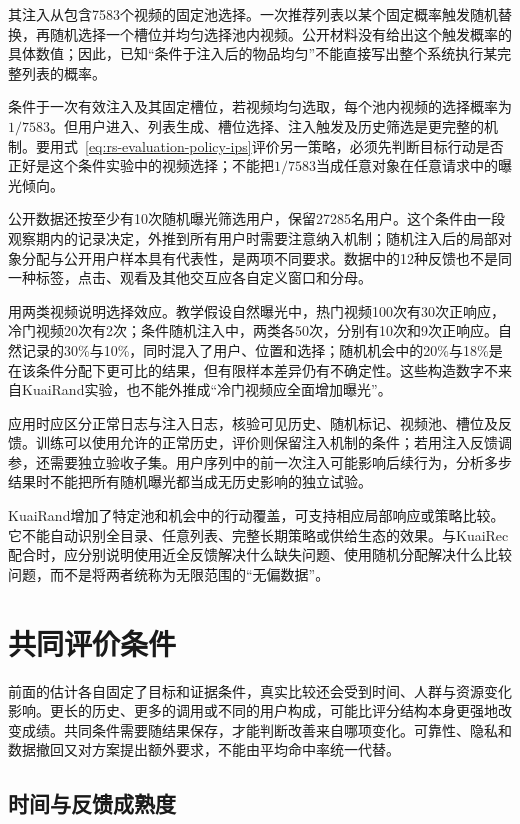 其注入从包含7583个视频的固定池选择。一次推荐列表以某个固定概率触发随机替换，再随机选择一个槽位并均匀选择池内视频。公开材料没有给出这个触发概率的具体数值；因此，已知“条件于注入后的物品均匀”不能直接写出整个系统执行某完整列表的概率。

条件于一次有效注入及其固定槽位，若视频均匀选取，每个池内视频的选择概率为$1/7583$。但用户进入、列表生成、槽位选择、注入触发及历史筛选是更完整的机制。要用式~\eqref{eq:rs-evaluation-policy-ips}评价另一策略，必须先判断目标行动是否正好是这个条件实验中的视频选择；不能把$1/7583$当成任意对象在任意请求中的曝光倾向。

公开数据还按至少有10次随机曝光筛选用户，保留27285名用户。这个条件由一段观察期内的记录决定，外推到所有用户时需要注意纳入机制；随机注入后的局部对象分配与公开用户样本具有代表性，是两项不同要求。数据中的12种反馈也不是同一种标签，点击、观看及其他交互应各自定义窗口和分母。

用两类视频说明选择效应。教学假设自然曝光中，热门视频100次有30次正响应，冷门视频20次有2次；条件随机注入中，两类各50次，分别有10次和9次正响应。自然记录的30\%与10\%，同时混入了用户、位置和选择；随机机会中的20\%与18\%是在该条件分配下更可比的结果，但有限样本差异仍有不确定性。这些构造数字不来自KuaiRand实验，也不能外推成“冷门视频应全面增加曝光”。

应用时应区分正常日志与注入日志，核验可见历史、随机标记、视频池、槽位及反馈。训练可以使用允许的正常历史，评价则保留注入机制的条件；若用注入反馈调参，还需要独立验收子集。用户序列中的前一次注入可能影响后续行为，分析多步结果时不能把所有随机曝光都当成无历史影响的独立试验。

KuaiRand增加了特定池和机会中的行动覆盖，可支持相应局部响应或策略比较。它不能自动识别全目录、任意列表、完整长期策略或供给生态的效果。与KuaiRec配合时，应分别说明使用近全反馈解决什么缺失问题、使用随机分配解决什么比较问题，而不是将两者统称为无限范围的“无偏数据”。

\section{共同评价条件}
\label{sec:rs-evaluation-conditions}

前面的估计各自固定了目标和证据条件，真实比较还会受到时间、人群与资源变化影响。更长的历史、更多的调用或不同的用户构成，可能比评分结构本身更强地改变成绩。共同条件需要随结果保存，才能判断改善来自哪项变化。可靠性、隐私和数据撤回又对方案提出额外要求，不能由平均命中率统一代替。

\subsection{时间与反馈成熟度}
\label{sec:rs-evaluation-time}


